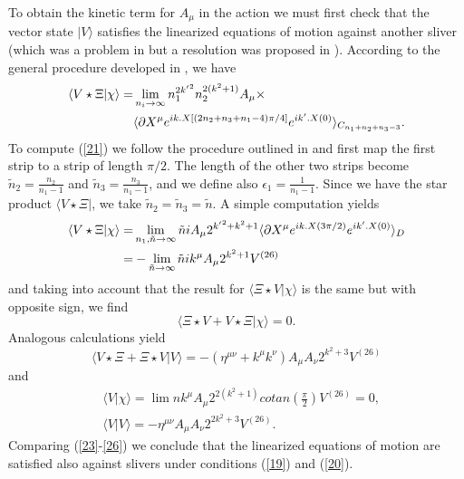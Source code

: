 \documentclass[a4paper,12pt]{article}
\begin{document}
To obtain the kinetic term for $A_\mu$ in the action we must first check that
the vector state $|V\rangle$ satisfies the linearized equations of
motion against another sliver (which was a problem in \cite{rsz3} but a
resolution was proposed in \cite{rv}). According to the general
procedure developed in \cite{rsz3}, we have
\begin{align}
\langle V\star\Xi|\chi\rangle=&
\lim_{n_i\to\infty}n_1^{2{k'}^2}n_2^{2(k^2+1)}A_\mu
\times \notag \\
&\langle\partial X^\mu e^{ik.X[(2n_2+n_3+n_1-4)\pi/4]}e^{ik'.X(0)}
\rangle_{C_{n_1+n_2+n_3-3}}.
\label{21}
\end{align}
To compute (\ref{21}) we follow the procedure outlined in \cite{rv} and
first map the first strip to a strip of length $\pi/2$. The length of the 
other two strips become $\tilde n_2=\frac{n_2}{n_1-1}$ and
$\tilde n_3=\frac{n_3}{n_1-1}$, and we define also $\epsilon_1=
\frac{1}{n_1-1}$. Since we have the star product $\langle V\star\Xi|$, we 
take $\tilde n_2=\tilde n_3=\tilde n$. A simple computation yields
\begin{align}
\langle V\star\Xi|\chi\rangle=&
\lim_{n_1,\tilde n\to\infty}\tilde n i A_\mu 2^{{k'}^2+k^2+1}
\langle\partial X^\mu e^{ik.X(3\pi/2)}e^{ik'.X(0)}
\rangle_D 
\notag \\
=&-\lim_{\tilde n\to\infty} \tilde n ik^\mu A_\mu 2^{k^2+1}V^{(26)}
\label{22}
\end{align}
and taking into account that the result for $\langle\Xi\star V|\chi\rangle$
is the same but with opposite sign, we find
\begin{equation}
\langle\Xi\star V+ V\star\Xi |\chi\rangle=0.
\label{23}
\end{equation}
Analogous calculations yield
\begin{equation}
\langle V\star\Xi+\Xi\star V|V\rangle=
-(\eta^{\mu\nu}+k^\mu k^\nu)A_\mu A_\nu 2^{k^2+3}V^{(26)}
\label{24}
\end{equation}
and
\begin{align}
&\langle V|\chi\rangle=\lim n k^\mu A_\mu 2^{2(k^2+1)}
cotan(\frac{\pi}{2})V^{(26)}=0,
\label{25} \\
&\langle V|V\rangle=-\eta^{\mu\nu} A_\mu A_\nu 2^{2k^2+3}
V^{(26)}.
\label{26}
\end{align}
Comparing (\ref{23}-\ref{26}) we conclude that the linearized equations
of motion are satisfied also against slivers under conditions
(\ref{19}) and (\ref{20}).
\end{document}
